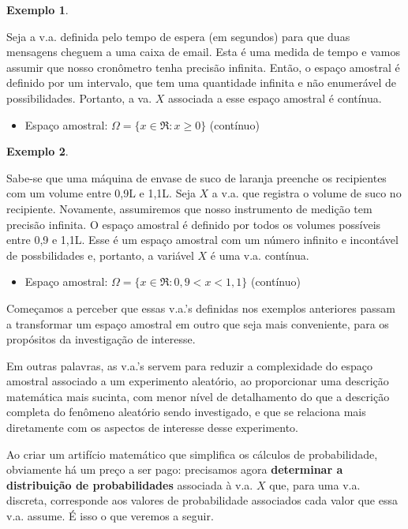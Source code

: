 \documentclass[
]{book}
\providecommand{\tightlist}{%
  \setlength{\itemsep}{0pt}\setlength{\parskip}{0pt}}
\theoremstyle{definition}
\theoremstyle{definition}
\newtheorem{example}{Exemplo}[chapter]
\theoremstyle{definition}
\theoremstyle{remark}
\begin{document}
\begin{example}
\protect\hypertarget{exm:unnamed-chunk-3}{}{\label{exm:unnamed-chunk-3} }
\end{example}

Seja a v.a. definida pelo tempo de espera (em segundos) para que duas mensagens cheguem a uma caixa de email. Esta é uma medida de tempo e vamos assumir que nosso cronômetro tenha precisão infinita. Então, o espaço amostral é definido por um intervalo, que tem uma quantidade infinita e não enumerável de possibilidades. Portanto, a va. \(X\) associada a esse espaço amostral é contínua.

\begin{itemize}
\tightlist
\item
  Espaço amostral: \({\Omega = \{ x \in \Re: x \geq0\}}\) (contínuo)
\end{itemize}

\begin{example}
\protect\hypertarget{exm:unnamed-chunk-4}{}{\label{exm:unnamed-chunk-4} }
\end{example}

Sabe-se que uma máquina de envase de suco de laranja preenche os recipientes com um volume entre 0,9L e 1,1L. Seja \(X\) a v.a. que registra o volume de suco no recipiente. Novamente, assumiremos que nosso instrumento de medição tem precisão infinita. O espaço amostral é definido por todos os volumes possíveis entre 0,9 e 1,1L. Esse é um espaço amostral com um número infinito e incontável de possbilidades e, portanto, a variável \(X\) é uma v.a. contínua.

\begin{itemize}
\tightlist
\item
  Espaço amostral: \({\Omega = \{ x \in \Re: 0,9 < x < 1,1 \}}\) (contínuo)
\end{itemize}

Começamos a perceber que essas v.a.'s definidas nos exemplos anteriores passam a transformar um espaço amostral em outro que seja mais conveniente, para os propósitos da investigação de interesse.

Em outras palavras, as v.a.'s servem para reduzir a complexidade do espaço amostral associado a um experimento aleatório, ao proporcionar uma descrição matemática mais sucinta, com menor nível de detalhamento do que a descrição completa do fenômeno aleatório sendo investigado, e que se relaciona mais diretamente com os aspectos de interesse desse experimento.

Ao criar um artifício matemático que simplifica os cálculos de probabilidade, obviamente há um preço a ser pago: precisamos agora \textbf{determinar a distribuição de probabilidades} associada à v.a. \(X\) que, para uma v.a. discreta, corresponde aos valores de probabilidade associados cada valor que essa v.a. assume. É isso o que veremos a seguir.
\end{document}
